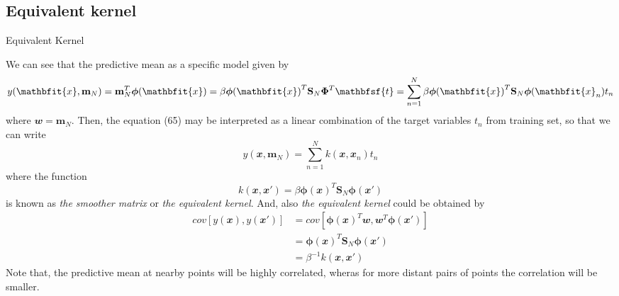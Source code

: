 \documentclass{bredelebeamer}
\begin{document}
\subsection{Equivalent kernel}
\begin{frame}{Equivalent Kernel}
  \begin{justify}
    We can see that the predictive mean as a specific model given by
    \begin{equation}
      y(\mathbfit{x}, \mathbf{m}_N)
      = \mathbf{m}_{N}^{T} \boldsymbol{\phi}(\mathbfit{x})
      = \beta {\boldsymbol{\phi}(\mathbfit{x})}^T \mathbf{S}_N \boldsymbol{\Phi}^T \mathbfsf{t}
      = \sum_{n=1}^{N} \beta {\boldsymbol{\phi}(\mathbfit{x})}^T \mathbf{S}_N \boldsymbol{\phi}(\mathbfit{x}_n)t_n
    \end{equation}
    where $\mathbfit{w} = \mathbf{m}_N$. Then, the equation (65) may be interpreted
    as a linear combination of the target variables $t_n$ from training set, so
    that we can write
    \begin{equation}
      y(\mathbfit{x}, \mathbf{m}_N)
      = \sum_{n=1}^{N} k(\mathbfit{x}, \mathbfit{x}_n) t_n
    \end{equation}
    where the function
    \begin{equation}
      k(\mathbfit{x}, \mathbfit{x}')
      = \beta {\boldsymbol{\phi}(\mathbfit{x})}^T \mathbf{S}_N \boldsymbol{\phi}(\mathbfit{x}')
    \end{equation}
    is known as \textit{the smoother matrix} or \textit{the equivalent kernel}.
    And, also \textit{the equivalent kernel} could be obtained by
    \begin{equation}
      \begin{split}
        cov[y(\mathbfit{x}), y(\mathbfit{x}')]
        &= cov[
          {\boldsymbol{\phi}(\mathbfit{x})}^T \mathbfit{w},
          \mathbfit{w}^T\boldsymbol{\phi}(\mathbfit{x}')
        ] \\
        &=
        {\boldsymbol{\phi}(\mathbfit{x})}^T
        \mathbf{S}_N \boldsymbol{\phi}(\mathbfit{x}')
        \\
        &= \beta^{-1} k(\mathbfit{x}, \mathbfit{x}')
      \end{split}
    \end{equation}
    Note that, the predictive mean at nearby points will be highly correlated,
    wheras for more distant pairs of points the correlation will be smaller.
  \end{justify}
\end{frame}
\end{document}
